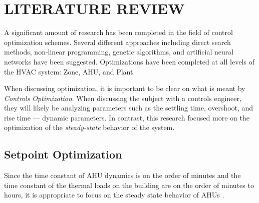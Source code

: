 %
%
%


\chapter{\texorpdfstring{\MakeUppercase{Literature Review}}{Literature Review}}


A significant amount of research has been completed in the field of
control optimization schemes. Several different approaches including
direct search methods, non-linear programming, genetic algorithms, and
artificial neural networks have been suggested. Optimizations have been
completed at all levels of the HVAC system: Zone, AHU, and Plant.  

When discussing optimization, it is important to be clear on what is
meant by \textit{Controls Optimization}. When discussing the subject
with a controls engineer, they will likely be analyzing parameters such
as the settling time, overshoot, and rise time --- dynamic parameters.
In contrast, this research focused more on the optimization of the
\textit{steady-state} behavior of the system. 





\section{Setpoint Optimization}

Since the time constant of AHU dynamics is on the order of minutes and
the time constant of the thermal loads on the building are on the order
of minutes to hours, it is appropriate to focus on the steady state
behavior of AHUs \cite{Bourdouxhe1998}.

